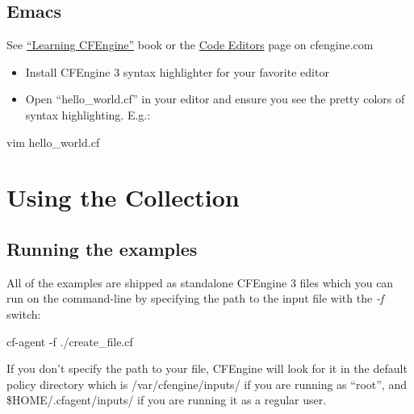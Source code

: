 \subsection{Emacs}

See \href{https://leanpub.com/learning-cfengine}{``Learning CFEngine''} book or the \href{http://cfengine.com/cfengine-code-editors/}{Code Editors} page on cfengine.com





\begin{aside}
\label{aside:exercise_3}

\begin{itemize}
\item{} Install CFEngine 3 syntax highlighter for your favorite editor
\item{} Open ``hello\_world.cf'' in your editor and ensure you see the pretty
colors of syntax highlighting.  E.g.:
\end{itemize}

\begin{code}
vim hello_world.cf
\end{code}

\end{aside}





\section{Using the Collection}





\subsection{Running the examples}

All of the examples are shipped as standalone CFEngine 3 files which
you can run on the command-line by specifying the path to the input
file with the \emph{-f} switch:

\begin{code}
cf-agent -f ./create_file.cf
\end{code}

If you don't specify the path to your file, CFEngine will look for
it in the default policy directory which is /var/cfengine/inputs/
if you are running  as ``root'', and \$HOME/.cfagent/inputs/
if you are running it as a regular user.

